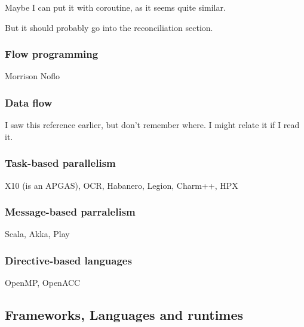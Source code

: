 Maybe I can put it with coroutine, as it seems quite similar.

But it should probably go into the reconciliation section.

\subsubsection{Flow programming}
Morrison
Noflo

\subsubsection{Data flow}

I saw this reference earlier, but don't remember where. \cite{Kahn1974}
I might relate it if I read it.


\subsubsection{Task-based parallelism}
X10 (is an APGAS), OCR, Habanero, Legion, Charm++, HPX

\subsubsection{Message-based parralelism}
Scala, Akka, Play




\subsubsection{Directive-based languages}
OpenMP, OpenACC



\subsection{Frameworks, Languages and runtimes}




